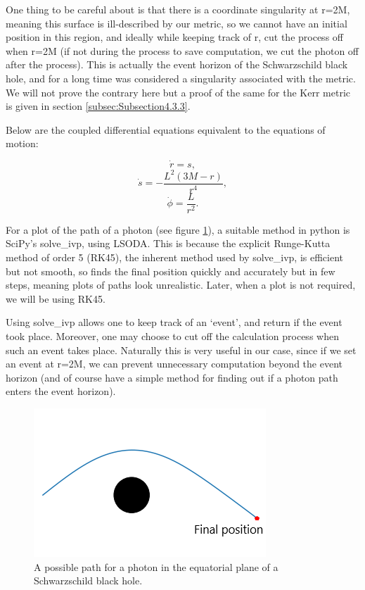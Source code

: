 \documentclass[oneside,openright,frontopenright, singlespacing]{dmathesis}
\begin{document}
\vspace{1em}
	One thing to be careful about is that there is a coordinate singularity at r=2M, meaning this surface is ill-described by our metric, so we cannot have an initial position in this region, and ideally while keeping track of r, cut the process off when r=2M (if not during the process to save computation, we cut the photon off after the process). This is actually the event horizon of the Schwarzschild black hole, and for a long time was considered a singularity associated with the metric. We will not prove the contrary here but a proof of the same for the Kerr metric is given in section \ref{subsec:Subsection4.3.3}.

\vspace{1em}
	Below are the coupled differential equations equivalent to the equations of motion:

	\[\dot{r}= s,\]
	\[\dot{s}=-\frac{L^2(3M-r)}{r^4},\]
	\[\dot{\phi}=\frac{L}{r^2}.\]

\vspace{1em}
	For a plot of the path of a photon (see figure \ref{fig:Figure3.1}), a suitable method in python is SciPy's solve\_ivp\cite{2020SciPy-NMeth}, using LSODA\cite{hindmarsh2005lsoda}. This is because the explicit Runge-Kutta method of order 5 (RK45)\cite{fehlberg1969low}, the inherent method used by solve\_ivp, is efficient but not smooth, so finds the final position quickly and accurately but in few steps, meaning plots of paths look unrealistic. Later, when a plot is not required, we will be using RK45.

\vspace{1em}
	Using solve\_ivp allows one to keep track of an ‘event’, and return if the event took place. Moreover, one may choose to cut off the calculation process when such an event takes place. Naturally this is very useful in our case, since if we set an event at r=2M, we can prevent unnecessary computation beyond the event horizon (and of course have a simple method for finding out if a photon path enters the event horizon).

\begin{figure}[!ht]
	\centering
	\includegraphics[width=0.4\linewidth]{img/Schwarzschildpath}
	\caption{A possible path for a photon in the equatorial plane of a Schwarzschild black hole.}
	\label{fig:Figure3.1}
\end{figure}
\end{document}
